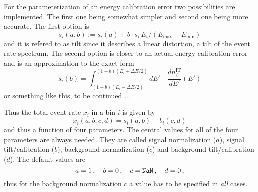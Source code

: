 For the parameterization of an energy calibration error two possibilities
are implemented. The first one being somewhat simpler and second one
being more accurate. The first option is
\begin{equation}
s_i(a,b):=s_i(a)+b\cdot s_i\, E_i/(E_\mathrm{max}-E_\mathrm{min})
\end{equation}
and it is refered to as tilt since it describes a linear distortion, a tilt
of the event rate spectrum. The second option is closer to an actual energy
calibration error and is an approximation to the exact form
\begin{equation}
s_i(b) = \int_{(1+b)(E_i-\Delta E/2)}^{(1+b)(E_i+\Delta E/2)} dE' \quad
\frac{dn_{\beta}^{\text{IT}}}{dE'} ( E')
\end{equation}
or something like this, to be continued ...

Thus the total event rate $x_i$ in a bin $i$ is given by
\begin{equation}
x_i(a,b,c,d)=s_i(a,b)+b_i(c,d)
\end{equation}
and thus a function of four parameters. The central values for all of
the four parameters are always needed. They are called signal normalization
($a$), signal tilt/calibration ($b$), background  normalization ($c$) and
background tilt/calibration ($d$). The default values are
\begin{equation}
a=1\,,\quad b=0\,,\quad c={\tt NaN}\,,\quad d=0\,,
\end{equation}
thus for the background normalization $c$ a value has to be specified in 
\emph{all} cases.

